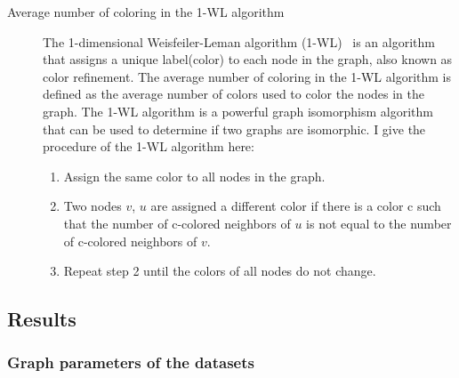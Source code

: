 \documentclass{article}
\begin{document}
\begin{description}
    \item [Average number of coloring in the 1-WL algorithm] 
    \sloppy
    The 1-dimensional Weisfeiler-Leman algorithm (1-WL)~\cite{weisfeiler1968reduction} is an algorithm that assigns a unique label(color) to each node in the graph, also known as color refinement. The average number of coloring in the 1-WL algorithm is defined as the average number of colors used to color the nodes in the graph. The 1-WL algorithm is a powerful graph isomorphism algorithm that can be used to determine if two graphs are isomorphic. I give the procedure of the 1-WL algorithm here:
    \begin{enumerate}
        \item Assign the same color to all nodes in the graph.
        \item Two nodes $v$, $u$ are assigned a different color if there is a color c such that the number of c-colored neighbors of $u$ is not equal to the number of c-colored neighbors of $v$.
        \item Repeat step 2 until the colors of all nodes do not change.
    \end{enumerate}
    
\end{description}

\subsection{Results}

\subsubsection{Graph parameters of the datasets}
\end{document}
